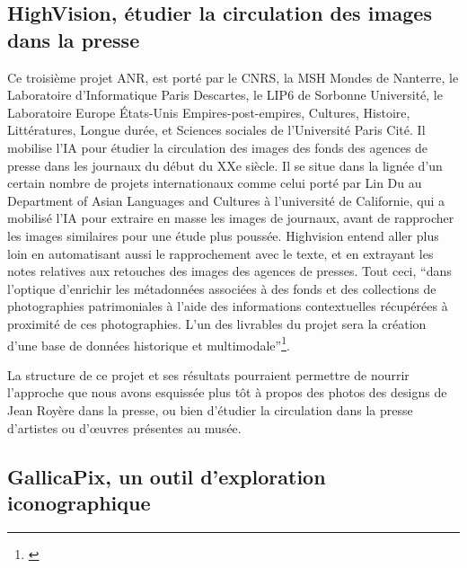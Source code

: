 \subsection{HighVision, étudier la circulation des images dans la presse}

Ce troisième projet ANR, est porté par le CNRS, la MSH Mondes de Nanterre, le Laboratoire d’Informatique Paris Descartes, le LIP6 de Sorbonne Université, le Laboratoire Europe États-Unis Empires-post-empires, Cultures, Histoire, Littératures, Longue durée, et Sciences sociales de l'Université Paris Cité. Il mobilise l’IA pour étudier la circulation des images des fonds des agences de presse dans les journaux du début du XXe siècle. Il se situe dans la lignée d’un certain nombre de projets internationaux comme celui porté par Lin Du au Department of Asian Languages and Cultures à l’université de Californie, qui a mobilisé l’IA pour extraire en masse les images de journaux, avant de rapprocher les images similaires pour une étude plus poussée. Highvision entend aller plus loin en automatisant aussi le rapprochement avec le texte, et en extrayant les notes relatives aux retouches des images des agences de presses. Tout ceci, \enquote{dans l’optique d’enrichir les métadonnées associées à des fonds et des collections de photographies patrimoniales à l’aide des informations contextuelles récupérées à proximité de ces photographies. L’un des livrables du projet sera la création d’une base de données historique et multimodale}\footnote{\cite{noauthor_high_2025}}.

La structure de ce projet et ses résultats pourraient permettre de nourrir l'approche que nous avons esquissée plus tôt à propos des photos des designs de Jean Royère dans la presse, ou bien d'étudier la circulation dans la presse d’artistes ou d’œuvres présentes au musée.

\subsection{GallicaPix, un outil d'exploration iconographique}

